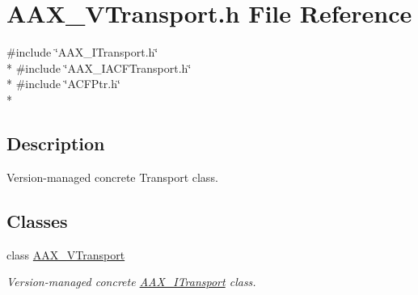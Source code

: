 \hypertarget{a00315}{}\section{A\+A\+X\+\_\+\+V\+Transport.\+h File Reference}
\label{a00315}
{\ttfamily \#include \char`\"{}A\+A\+X\+\_\+\+I\+Transport.\+h\char`\"{}}\\*
{\ttfamily \#include \char`\"{}A\+A\+X\+\_\+\+I\+A\+C\+F\+Transport.\+h\char`\"{}}\\*
{\ttfamily \#include \char`\"{}A\+C\+F\+Ptr.\+h\char`\"{}}\\*


\subsection{Description}
Version-\/managed concrete Transport class. 

\subsection*{Classes}
\begin{DoxyCompactItemize}
\item 
class \hyperlink{a00141}{A\+A\+X\+\_\+\+V\+Transport}
\begin{DoxyCompactList}\small\item\em Version-\/managed concrete \hyperlink{a00116}{A\+A\+X\+\_\+\+I\+Transport} class. \end{DoxyCompactList}\end{DoxyCompactItemize}
